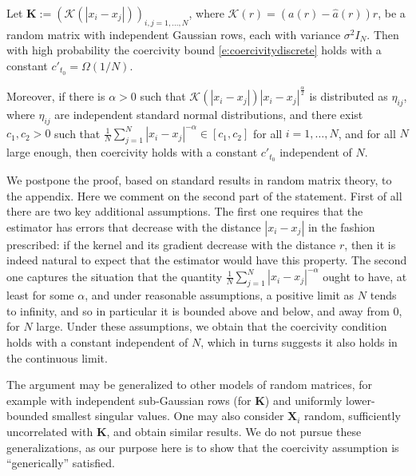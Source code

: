 \begin{proposition}
Let $\mathbf{K}:=(\mathcal K(|x_i-x_j|))_{i,j=1,\dots,N}$, where $\mathcal K(r)=(a(r)- \widehat a(r))r$,  be a random matrix with independent Gaussian rows, each with variance $\sigma^2I_N$. Then with high probability the coercivity bound \eqref{e:coercivitydiscrete} holds with a constant $c'_{t_0}=\Omega(1/N)$.

Moreover, if there is $\alpha>0$ such that $\mathcal{K}(|x_i-x_j|)|x_i-x_j|^\frac\alpha2$ is distributed as $\eta_{ij}$, where $\eta_{ij}$ are independent standard normal distributions, and there exist $c_1,c_2>0$ such that $\frac1N\sum_{j=1}^N|x_i-x_j|^{-\alpha}\in[c_1,c_2]$ for all $i=1,\dots,N$, and for all $N$ large enough, then coercivity holds with a constant $c'_{t_0}$ independent of $N$.
\label{p:randomcoercivity}
\end{proposition}
We postpone the proof, based on standard results in random matrix theory, to the appendix.
Here we comment on the second part of the statement. First of all there are two key additional assumptions. The first one requires that the estimator has errors that decrease with the distance $|x_i-x_j|$ in the fashion prescribed: if the kernel and its gradient decrease with the distance $r$, then it is indeed natural to expect that the estimator would have this property. The second one captures the situation that the quantity $\frac1N\sum_{j=1}^N|x_i-x_j|^{-\alpha}$ ought to have, at least for some $\alpha$, and under reasonable assumptions, a positive limit as $N$ tends to infinity, and so in particular it is bounded above and below, and away from $0$, for $N$ large. 
Under these assumptions, we obtain that the coercivity condition holds with a constant independent of $N$, which in turns suggests it also holds in the continuous limit.

The argument  may be generalized to other models of random matrices, for example with independent sub-Gaussian rows (for $\mathbf{K}$) and uniformly lower-bounded smallest singular values. One may also consider $\mathbf{X}_i$ random, sufficiently uncorrelated with $\mathbf{K}$, and obtain similar results. We do not pursue these generalizations, as our purpose here is to show that the coercivity assumption is  ``generically'' satisfied.


